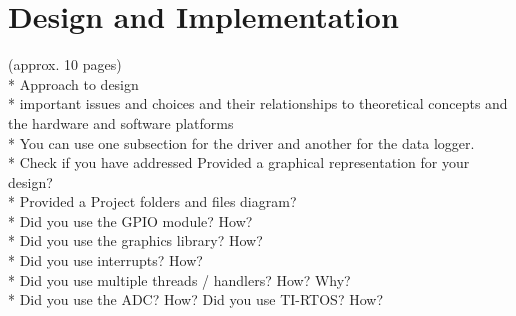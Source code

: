 \chapter{Design and Implementation}

(approx. 10 pages)\\
* Approach to design\\
* important issues and choices and their relationships to theoretical concepts and the hardware and software platforms\\
* You can use one subsection for the driver and another for the data logger.\\

* Check if you have addressed Provided a graphical representation for your design?\\
* Provided a Project folders and files diagram?\\
* Did you use the GPIO module? How?\\
* Did you use the graphics library? How?\\
* Did you use interrupts? How?\\
* Did you use multiple threads / handlers? How? Why?\\
* Did you use the ADC? How? Did you use TI-RTOS? How?